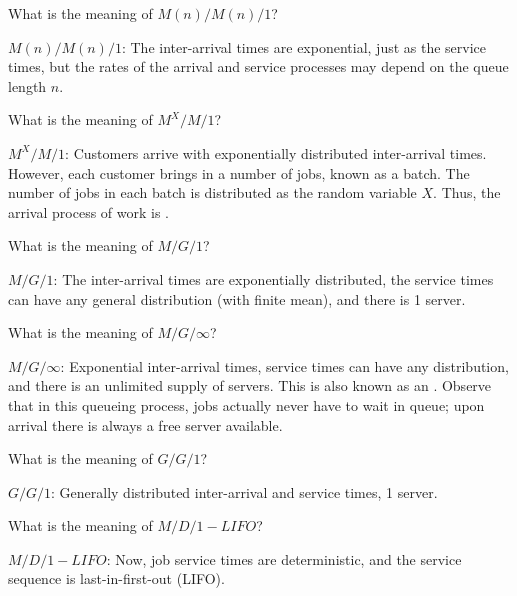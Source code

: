 \begin{exercise}
  What is the meaning of $M(n)/M(n)/1$?
\begin{solution}
$M(n)/M(n)/1$: The inter-arrival times are exponential, just as
  the service times, but the rates of the arrival and service processes
  may depend on the queue length $n$. 
\end{solution}
\end{exercise}


\begin{exercise}
  What is the meaning of $M^X/M/1$?
\begin{solution}
 $M^X/M/1$: Customers arrive with exponentially distributed
  inter-arrival times. However, each customer brings in a number of
  jobs, known as a batch. The number of jobs in each batch is
  distributed as the random variable $X$. Thus, the arrival process of
  work is .
\end{solution}
\end{exercise}

\begin{extra}
  What is the meaning of $M/G/1$?
\begin{solution}
$M/G/1$: The inter-arrival times are exponentially distributed,
  the service times can have any general distribution (with
  finite mean), and there is 1 server.
\end{solution}
\end{extra}


\begin{extra}
  What is the meaning of $M/G/\infty$?
\begin{solution}
 $M/G/\infty$: Exponential inter-arrival times, service times can
  have any distribution, and there is an unlimited supply of
  servers. This is also known as an . Observe
  that in this queueing process, jobs actually never have to wait in
  queue; upon arrival there is always a free server available.
\end{solution}
\end{extra}

\begin{extra}
  What is the meaning of $G/G/1$?
\begin{solution}
 $G/G/1$: Generally distributed inter-arrival and service times, 1 server.
\end{solution}
\end{extra}

\begin{extra}
  What is the meaning of $M/D/1-LIFO$?
\begin{solution}
 $M/D/1-LIFO$:  Now, job service times are deterministic, and the service sequence is last-in-first-out (LIFO).
\end{solution}
\end{extra}

